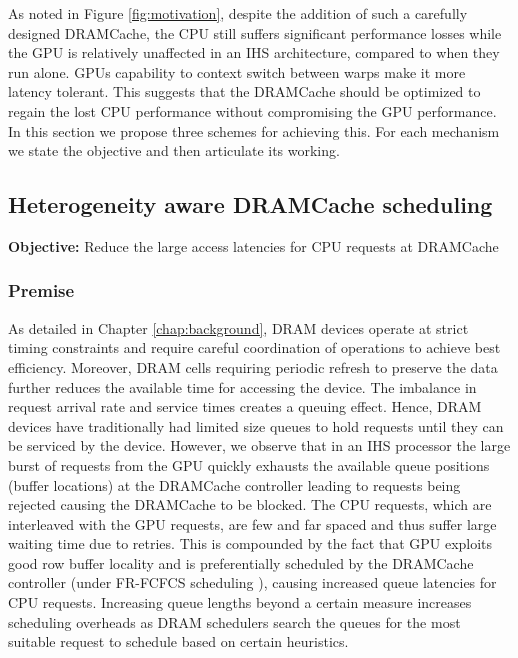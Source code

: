 As noted  in Figure \ref{fig:motivation}, despite the addition of such a carefully designed DRAMCache, the CPU still suffers significant performance losses while the GPU is relatively unaffected in an IHS architecture, compared to when they run alone. GPUs capability to context switch between warps make it more latency tolerant. This suggests that the DRAMCache should be optimized to regain the lost CPU performance without compromising the GPU performance. In this section we propose three schemes for achieving this. For each mechanism we state the objective and then articulate its working.


\subsection{Heterogeneity aware DRAMCache scheduling} 
\textbf{Objective:} Reduce the large access latencies for CPU requests at DRAMCache
\subsubsection{Premise}
As detailed in Chapter \ref{chap:background}, DRAM devices operate at strict timing constraints and require careful coordination of operations to achieve best efficiency. Moreover, DRAM cells requiring periodic refresh to preserve the data further reduces the available time for accessing the device. The imbalance in request arrival rate and service times creates a queuing effect. Hence, DRAM devices have traditionally had limited size queues to hold requests until they can be serviced by the device. However, we observe that in an IHS processor the large burst of requests from the GPU quickly exhausts the available queue positions (buffer locations) at the DRAMCache controller leading to requests being rejected causing the DRAMCache to be blocked. 
The CPU requests, which are interleaved with the GPU requests, are few and far spaced and thus suffer large waiting time due to retries. This is compounded by the fact that GPU exploits good row buffer locality and is preferentially scheduled by the DRAMCache controller (under FR-FCFCS scheduling \cite{sms}), causing increased queue latencies for CPU requests. Increasing queue lengths beyond a certain measure increases scheduling overheads as DRAM schedulers search the queues for the most suitable request to schedule based on certain heuristics.

